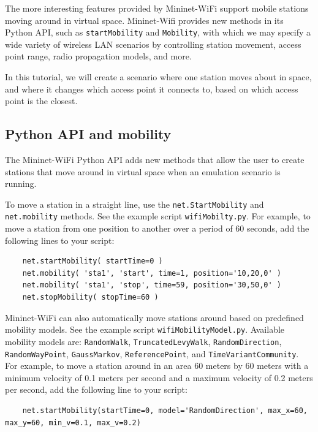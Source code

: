 The more interesting features provided by Mininet-WiFi support mobile stations moving around in virtual space. Mininet-Wifi provides new methods in its Python API, such as \texttt{startMobility} and \texttt{Mobility}, with which we may specify a wide variety of wireless LAN scenarios by controlling station movement, access point range, radio propagation models, and more.

In this tutorial, we will create a scenario where one station moves about in space, and where it changes which access point it connects to, based on which access point is the closest.

\subsection{Python API and mobility}

The Mininet-WiFi Python API adds new methods that allow the user to create stations that move around in virtual space when an emulation scenario is running.

To move a station in a straight line, use the \texttt{net.StartMobility} and \texttt{net.mobility} methods. See the example script \texttt{wifiMobilty.py}. For example, to move a station from one position to another over a period of 60 seconds, add the following lines to your script:

\begin{verbatim}
    net.startMobility( startTime=0 )
    net.mobility( 'sta1', 'start', time=1, position='10,20,0' )
    net.mobility( 'sta1', 'stop', time=59, position='30,50,0' )
    net.stopMobility( stopTime=60 )
\end{verbatim}

    

Mininet-WiFi can also automatically move stations around based on predefined mobility models. See the example script \texttt{wifiMobilityModel.py}. Available mobility models are: \texttt{RandomWalk}, \texttt{TruncatedLevyWalk}, \texttt{RandomDirection}, \texttt{RandomWayPoint}, \texttt{GaussMarkov}, \texttt{ReferencePoint}, and \texttt{TimeVariantCommunity}. For example, to move a station around in an area 60 meters by 60 meters with a minimum velocity of 0.1 meters per second and a maximum velocity of 0.2 meters per second, add the following line to your script:

\begin{verbatim}
    net.startMobility(startTime=0, model='RandomDirection', max_x=60, max_y=60, min_v=0.1, max_v=0.2)
\end{verbatim}    

